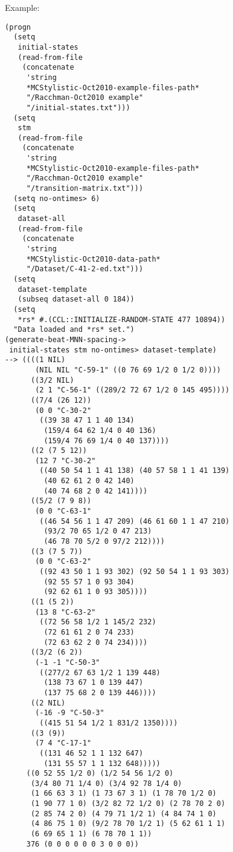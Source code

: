 \vspace{0.5cm}
\noindent Example:
\begin{verbatim}
(progn
  (setq
   initial-states
   (read-from-file
    (concatenate
     'string
     *MCStylistic-Oct2010-example-files-path*
     "/Racchman-Oct2010 example"
     "/initial-states.txt")))
  (setq
   stm
   (read-from-file
    (concatenate
     'string
     *MCStylistic-Oct2010-example-files-path*
     "/Racchman-Oct2010 example"
     "/transition-matrix.txt")))
  (setq no-ontimes> 6)
  (setq
   dataset-all
   (read-from-file
    (concatenate
     'string
     *MCStylistic-Oct2010-data-path*
     "/Dataset/C-41-2-ed.txt")))
  (setq
   dataset-template
   (subseq dataset-all 0 184))
  (setq
   *rs* #.(CCL::INITIALIZE-RANDOM-STATE 477 10894))
  "Data loaded and *rs* set.")
(generate-beat-MNN-spacing->
 initial-states stm no-ontimes> dataset-template)
--> ((((1 NIL)
       (NIL NIL "C-59-1" ((0 76 69 1/2 0 1/2 0))))
      ((3/2 NIL)
       (2 1 "C-56-1" ((289/2 72 67 1/2 0 145 495))))
      ((7/4 (26 12))
       (0 0 "C-30-2"
        ((39 38 47 1 1 40 134)
         (159/4 64 62 1/4 0 40 136)
         (159/4 76 69 1/4 0 40 137))))
      ((2 (7 5 12))
       (12 7 "C-30-2"
        ((40 50 54 1 1 41 138) (40 57 58 1 1 41 139)
         (40 62 61 2 0 42 140)
         (40 74 68 2 0 42 141))))
      ((5/2 (7 9 8))
       (0 0 "C-63-1"
        ((46 54 56 1 1 47 209) (46 61 60 1 1 47 210)
         (93/2 70 65 1/2 0 47 213)
         (46 78 70 5/2 0 97/2 212))))
      ((3 (7 5 7))
       (0 0 "C-63-2"
        ((92 43 50 1 1 93 302) (92 50 54 1 1 93 303)
         (92 55 57 1 0 93 304)
         (92 62 61 1 0 93 305))))
      ((1 (5 2))
       (13 8 "C-63-2"
        ((72 56 58 1/2 1 145/2 232)
         (72 61 61 2 0 74 233)
         (72 63 62 2 0 74 234))))
      ((3/2 (6 2))
       (-1 -1 "C-50-3"
        ((277/2 67 63 1/2 1 139 448)
         (138 73 67 1 0 139 447)
         (137 75 68 2 0 139 446))))
      ((2 NIL)
       (-16 -9 "C-50-3"
        ((415 51 54 1/2 1 831/2 1350))))
      ((3 (9))
       (7 4 "C-17-1"
        ((131 46 52 1 1 132 647)
         (131 55 57 1 1 132 648)))))
     ((0 52 55 1/2 0) (1/2 54 56 1/2 0)
      (3/4 80 71 1/4 0) (3/4 92 78 1/4 0)
      (1 66 63 3 1) (1 73 67 3 1) (1 78 70 1/2 0)
      (1 90 77 1 0) (3/2 82 72 1/2 0) (2 78 70 2 0)
      (2 85 74 2 0) (4 79 71 1/2 1) (4 84 74 1 0)
      (4 86 75 1 0) (9/2 78 70 1/2 1) (5 62 61 1 1)
      (6 69 65 1 1) (6 78 70 1 1))
     376 (0 0 0 0 0 0 3 0 0 0))
\end{verbatim}

